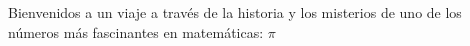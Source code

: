 \documentclass[preview]{standalone}
\begin{document}
\begin{center}
Bienvenidos a un viaje a través de la historia y los misterios de uno de los números más fascinantes en matemáticas: $\pi$
\end{center}
\end{document}
